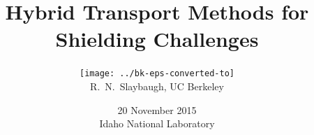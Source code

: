 \documentclass[xcolor=x11names,compress]{beamer}
\renewcommand{\(}{\begin{columns}}
\renewcommand{\)}{\end{columns}}
\newcommand{\<}[1]{\begin{column}{#1}}
\renewcommand{\>}{\end{column}}
\begin{document}
\begin{frame}
\title{Hybrid Transport Methods for Shielding Challenges}
\author{\texttt{[image: ../bk-eps-converted-to]}\\\vspace*{1em}R.\ N.\ Slaybaugh, UC Berkeley}%
\date{20 November 2015 \\ Idaho National Laboratory}
\titlepage
\end{frame}


\end{document}
